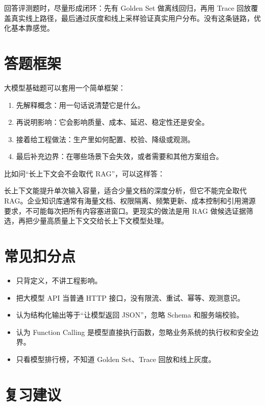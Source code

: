 \documentclass[9pt,a4paper,twocolumn]{ctexart}
\begin{document}
回答评测题时，尽量形成闭环：先有 Golden Set 做离线回归，再用 Trace 回放覆盖真实线上路径，最后通过灰度和线上采样验证真实用户分布。没有这条链路，优化基本靠感觉。



\section*{答题框架}


大模型基础题可以套用一个简单框架：


\begin{enumerate}[itemsep=1pt, topsep=2pt]
  \item 先解释概念：用一句话说清楚它是什么。
  \item 再说明影响：它会影响质量、成本、延迟、稳定性还是安全。
  \item 接着给工程做法：生产里如何配置、校验、降级或观测。
  \item 最后补充边界：在哪些场景下会失效，或者需要和其他方案组合。
\end{enumerate}


比如问“长上下文会不会取代 RAG”，可以这样答：



长上下文能提升单次输入容量，适合少量文档的深度分析，但它不能完全取代 RAG。企业知识库通常有海量文档、权限隔离、频繁更新、成本控制和引用溯源要求，不可能每次把所有内容塞进窗口。更现实的做法是用 RAG 做候选证据筛选，再把少量高质量上下文交给长上下文模型处理。



\section*{常见扣分点}

\begin{itemize}[itemsep=1pt, topsep=2pt]
  \item 只背定义，不讲工程影响。
  \item 把大模型 API 当普通 HTTP 接口，没有限流、重试、幂等、观测意识。
  \item 认为结构化输出等于“让模型返回 JSON”，忽略 Schema 和服务端校验。
  \item 认为 Function Calling 是模型直接执行函数，忽略业务系统的执行权和安全边界。
  \item 只看模型排行榜，不知道 Golden Set、Trace 回放和线上灰度。
\end{itemize}


\section*{复习建议}
\end{document}
